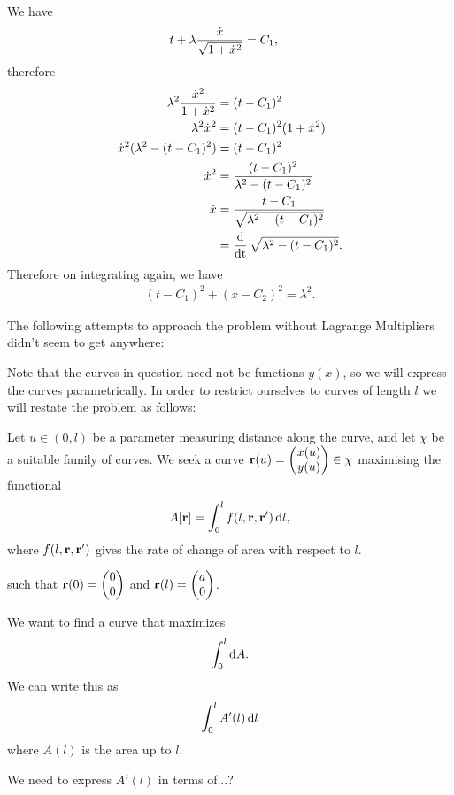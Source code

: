 We have
\begin{align*}
  t + \lambda \frac{\dot{x}}{\sqrt{1 + \dot{x}^2}} &= C_1,
\end{align*}
therefore
\begin{align*}
  \lambda^2 \frac{\dot{x}^2}{1 + \dot{x}^2} &= (t - C_1)^2 \\
  \lambda^2 \dot{x}^2 &= (t - C_1)^2(1 + \dot{x}^2) \\
  \dot{x}^2(\lambda^2 - (t - C_1)^2) &= (t - C_1)^2 \\
  \dot{x}^2 &= \frac{(t - C_1)^2}{\lambda^2 - (t - C_1)^2} \\
  \dot{x} &= \frac{t - C_1}{\sqrt{\lambda^2 - (t - C_1)^2}} \\
        &= \operatorname{\frac{\text{d}}{\text{dt}}} \sqrt{\lambda^2 - (t - C_1)^2}.
\end{align*}
Therefore on integrating again, we have
\begin{align*}
  (t - C_1)^2 + (x - C_2)^2 = \lambda^2.
\end{align*}

  The following attempts to approach the problem without Lagrange Multipliers didn't seem to get anywhere:

  Note that the curves in question need not be functions $y(x)$, so we will express the curves
  parametrically. In order to restrict ourselves to curves of length $l$ we will restate the problem
  as follows:

  Let $u \in (0, l)$ be a parameter measuring distance along the curve, and let $\chi$ be a suitable family of
  curves. We seek a curve $\mathbf{r}(u) = \begin{pmatrix}x(u)\\y(u)\end{pmatrix} \in \chi$ maximising the functional
\begin{align*}
  A[\r] = \int_0^l f(l, \r, \r') \d l,
\end{align*}
where $f(l, \mathbf{r}, \mathbf{r}')$ gives the rate of change of area with respect to $l$.

such that $\mathbf{r}(0) = \begin{pmatrix}0\\0\end{pmatrix}$ and $\mathbf{r}(l) = \begin{pmatrix}a\\0\end{pmatrix}$.

We want to find a curve that maximizes
\begin{align*}
  \int_0^l \d A.
\end{align*}
We can write this as
\begin{align*}
  \int_0^l A'(l) \d l
\end{align*}
where $A(l)$ is the area up to $l$.

We need to express $A'(l)$ in terms of...?

